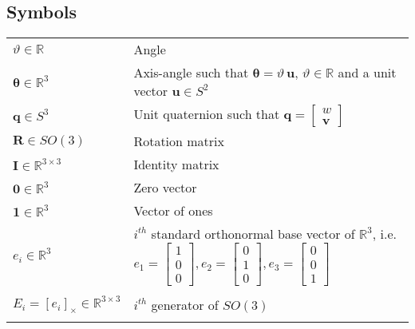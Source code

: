 \documentclass{article}
\renewcommand\aa{\bm{\theta}}
\renewcommand\t{\vartheta}
\newcommand\R{\bm{R}}
\newcommand\q{\bm{q}}
\newcommand\I{\bm{I}}
\renewcommand\u{\bm{u}}
\renewcommand\v{\bm{v}}
\renewcommand\skew[1]{[#1]_{\times}}
\newcommand\Real{\mathbb{R}}
\begin{document}
\subsection{Symbols}
\begin{tabular}{l p{15cm}}
  $\t \in \Real$ & Angle \\
  $\aa \in \Real^3$ & Axis-angle such that $\aa = \t \, \u$, $\t \in \Real$ and a unit vector $\u \in S^2$ \\
  $\q \in S^3$ & Unit quaternion such that $\q = \begin{bmatrix} w \\ \v \end{bmatrix}$ \\
  $\R \in SO(3)$ & Rotation matrix \\
  $\I \in \Real^{3\times3}$ & Identity matrix \\
  $\bm{0} \in \Real^{3}$ & Zero vector \\
  $\bm{1} \in \Real^{3}$ & Vector of ones \\
   $e_i \in \Real^3$ & $i^{th}$ standard orthonormal base vector of $\Real^3$, i.e.
     $e_1=\begin{bmatrix} 1 \\ 0 \\ 0 \end{bmatrix},
     e_2 =\begin{bmatrix} 0 \\ 1 \\ 0 \end{bmatrix},
       e_3 =\begin{bmatrix} 0 \\ 0 \\ 1 \end{bmatrix}$ \\ [10pt] \\
   $E_i = \skew{e_i}\in \Real^{3 \times 3}$ & $i^{th}$ generator of $SO(3)$ \\ [10pt] \\
\end{tabular}
\end{document}
